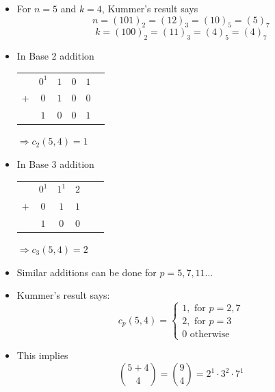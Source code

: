 \documentclass{beamer}
\begin{document}
\begin{frame}
    \begin{itemize}
        \item For $n=5$ and $k=4$, Kummer's result says
        \begin{equation*}
            n = (101)_2 = (12)_3 = (10)_5 = (5)_7
        \end{equation*}
        \begin{equation*}
            k = (100)_2 = (11)_3 = (4)_5 = (4)_7
        \end{equation*}
        \item In Base 2 addition
        \begin{tabular}{cccccc}
            & $0^1$ & $1$ & $0$ & $1$ \\
            + & $0$ & $1$ & $0$ & $0$ \\
            \hline
            & $1$ & $0$ & $0$ & $1$  
        \end{tabular}
        $\Rightarrow c_2(5,4) = 1$ 
        \item In Base 3 addition 
        \begin{tabular}{cccccc}
            & $0^1$ & $1^1$ & $2$\\
            + & $0$ & $1$ & $1$\\
            \hline
            & $1$ & $0$ & $0$   
        \end{tabular}
        $\Rightarrow c_3(5,4) = 2$
        \item Similar additions can be done for $p = 5,7,11\dots$
    \end{itemize}
\end{frame}

\begin{frame}
    \begin{itemize}
        
        \item Kummer's result says:
        \begin{equation*}
            c_{p}(5,4)=\left\{\begin{array}{l}{1, \text { for } p=2,7} \\
            {2, \text { for } p=3 } \\
        {0 \text{ otherwise }}\end{array}\right.
        \end{equation*}
        \item This implies 
        \begin{equation*}
            \binom{5+4}{4} = \binom{9}{4} = 2^1 \cdot 3^2 \cdot 7^1
        \end{equation*}
    \end{itemize}
\end{frame}
\end{document}
